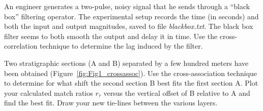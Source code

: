 \begin{problem}
	An engineer generates a two-pulse, noisy signal that he sends through a ``black box'' filtering operator.
The experimental setup records the time (in seconds) and both the input and output magnitudes, saved to file
\emph{blackbox.txt}.  The black box filter seems to both smooth the output and delay it in time.
Use the cross-correlation technique to determine the lag induced by the filter.
\end{problem}

\begin{problem}
Two stratigraphic sections (A and B) separated by a few hundred meters have been obtained (Figure~\ref{fig:Fig1_crossassoc}).
Use the cross-association technique to determine for what shift the second section B best fits the first section A.
Plot your calculated match ratios $r_\tau$ versus the vertical offset of B relative to A and find the best fit.
Draw your new tie-lines between the various layers.
\end{problem}
